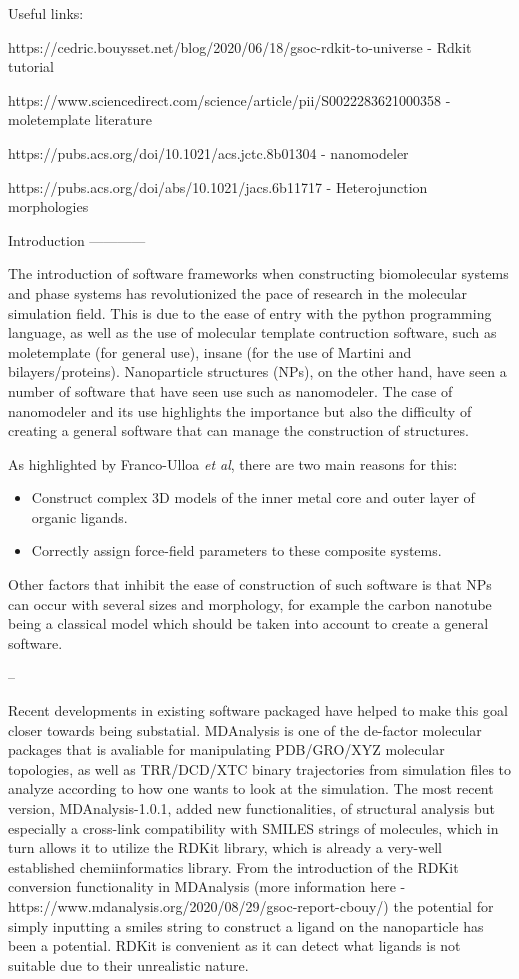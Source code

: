 Useful links:

https://cedric.bouysset.net/blog/2020/06/18/gsoc-rdkit-to-universe - Rdkit tutorial

https://www.sciencedirect.com/science/article/pii/S0022283621000358 - moletemplate literature

https://pubs.acs.org/doi/10.1021/acs.jctc.8b01304 - nanomodeler

https://pubs.acs.org/doi/abs/10.1021/jacs.6b11717 - Heterojunction morphologies 

Introduction
------------

The introduction of software frameworks when constructing biomolecular systems and phase systems has revolutionized the pace of research in the
molecular simulation field. This is due to the ease of entry with the python programming language, as well as the use of molecular template contruction software,
such as moletemplate (for general use), insane (for the use of Martini and bilayers/proteins). Nanoparticle structures (NPs), on the other hand, have seen a number of software that
have seen use such as nanomodeler. The case of nanomodeler and its use highlights the importance but also the difficulty of creating a general software that can manage the
construction of structures.

As highlighted by Franco-Ulloa \emph{et al}, there are two main reasons for this:
\begin{itemize}
\item Construct complex 3D models of the inner metal core and outer layer of organic ligands.
\item Correctly assign force-field parameters to these composite systems.
\end{itemize} 
Other factors that inhibit the ease of construction of such software is that NPs can occur with several sizes and morphology, for example the carbon nanotube being a classical
model which should be taken into account to create a general software. 

--

Recent developments in existing software packaged have helped to make this goal closer towards being substatial. MDAnalysis is one of the de-factor molecular packages that
is avaliable for manipulating PDB/GRO/XYZ molecular topologies, as well as TRR/DCD/XTC binary trajectories from simulation files to analyze according to how one wants to look at the simulation. 
The most recent version, MDAnalysis-1.0.1, added new functionalities, of structural analysis but especially a cross-link compatibility with SMILES strings of molecules, which in turn
allows it to utilize the RDKit library, which is already a very-well established chemiinformatics library. From the introduction of the RDKit conversion functionality in MDAnalysis (more information here - https://www.mdanalysis.org/2020/08/29/gsoc-report-cbouy/) the potential for simply inputting a smiles string to construct a ligand on the nanoparticle has been a potential. RDKit is convenient as it can detect what ligands is not suitable due to
their unrealistic nature.

